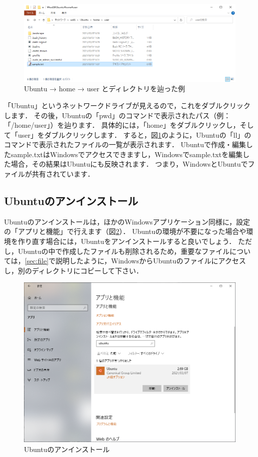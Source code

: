 \documentclass[dvipdfmx]{jarticle}
\begin{document}
\begin{figure}[h]
  \centering
  \includegraphics[width=0.95\linewidth]{figures/explorer2.png}
  \caption{Ubuntu → home → user とディレクトリを辿った例}
  \label{fig:explorer2}
\end{figure}

「Ubuntu」というネットワークドライブが見えるので，これをダブルクリックします．
その後，Ubuntuの「pwd」のコマンドで表示されたパス（例：「/home/user」）を辿ります．
具体的には，「home」をダブルクリックし，そして「user」をダブルクリックします．
すると，図\ref{fig:explorer2}のように，Ubuntuの「ll」のコマンドで表示されたファイルの一覧が表示されます．
Ubuntuで作成・編集したsample.txtはWindowsでアクセスできますし，Windowsでsample.txtを編集した場合，その結果はUbuntuにも反映されます．
つまり，WindowsとUbuntuでファイルが共有されています．

\subsection{Ubuntuのアンインストール}

Ubuntuのアンインストールは，ほかのWindowsアプリケーション同様に，設定の「アプリと機能」で行えます（図\ref{fig:WindowsApp}）．
Ubuntuの環境が不要になった場合や環境を作り直す場合には，Ubuntuをアンインストールすると良いでしょう．
ただし，Ubuntuの中で作成したファイルも削除されるため，重要なファイルについては，\ref{sec:file}で説明したように，WindowsからUbuntuのファイルにアクセスし，別のディレクトリにコピーして下さい．

\begin{figure}[h]
  \centering
  \includegraphics[width=0.95\linewidth]{figures/WindowsApp.png}
  \caption{Ubuntuのアンインストール}
  \label{fig:WindowsApp}
\end{figure}
\end{document}
